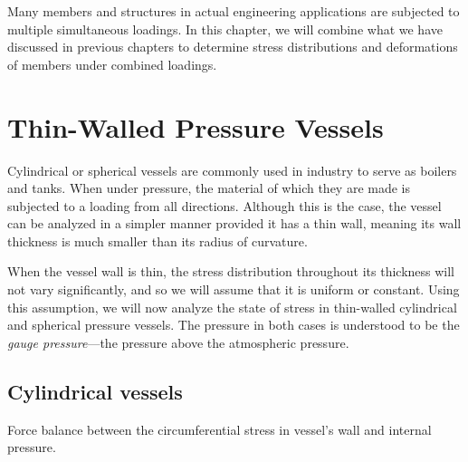 \documentclass[
10pt,
a4paper,
openany,
svgnames,
]{kaobook} %
\begin{document}
Many members and structures in actual engineering applications are subjected to multiple simultaneous loadings. In this chapter, we will combine what we have discussed in previous chapters to determine stress distributions and deformations of members under combined loadings.

\section{Thin-Walled Pressure Vessels}

Cylindrical or spherical vessels are commonly used in industry to serve as boilers and tanks. When under pressure, the material of which they are made is subjected to a loading from all directions. Although this is the case, the vessel can be analyzed in a simpler manner provided it has a thin wall, meaning its wall thickness is much smaller than its radius of curvature.

When the vessel wall is thin, the stress distribution throughout its thickness will not vary significantly, and so we will assume that it is uniform or constant. Using this assumption, we will now analyze the state of stress in thin-walled cylindrical and spherical pressure vessels. The pressure in both cases is understood to be the \emph{gauge pressure}—the pressure above the atmospheric pressure.

\subsection{Cylindrical vessels}

\begin{marginfigure}
  \centering
  \caption{Force balance between the circumferential stress in vessel's wall and internal pressure.}
  \label{fig: cylindrical vessel circumferential}
\end{marginfigure}
\end{document}
